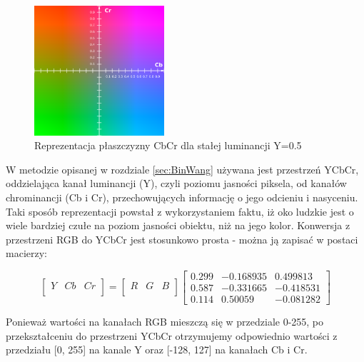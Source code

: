\paragraph{}
\begin{figure}[!htb]
\centering
\includegraphics[width=182px]{img/YCbCr}
\caption{Reprezentacja płaszczyzny 
CbCr dla stałej luminancji Y=0.5}
\end{figure}
W metodzie opisanej w rozdziale \ref{sec:BinWang}  używana jest przestrzeń YCbCr, oddzielająca kanał luminancji (Y), czyli poziomu jasności piksela, od kanałów chrominancji (Cb i Cr), przechowujących informację o jego odcieniu i nasyceniu. Taki sposób reprezentacji powstał z wykorzystaniem faktu, iż oko ludzkie jest o wiele bardziej czułe na poziom jasności obiektu, niż na jego kolor. Konwersja z przestrzeni RGB do YCbCr jest stosunkowo prosta - można ją zapisać w postaci macierzy:

\[
\begin{bmatrix}
    Y & Cb & Cr \\
\end{bmatrix}
=
\begin{bmatrix}
    R & G & B \\
\end{bmatrix}
\begin{bmatrix}
    0.299 & -0.168935 & 0.499813 \\
    0.587 & -0.331665 & -0.418531 \\
    0.114 & 0.50059 & -0.081282 
\end{bmatrix}
\]


Ponieważ wartości na kanałach RGB mieszczą się w przedziale 0-255, po przekształceniu do przestrzeni YCbCr otrzymujemy odpowiednio wartości z przedziału [0, 255] na kanale Y oraz [-128, 127] na kanałach Cb i Cr.

